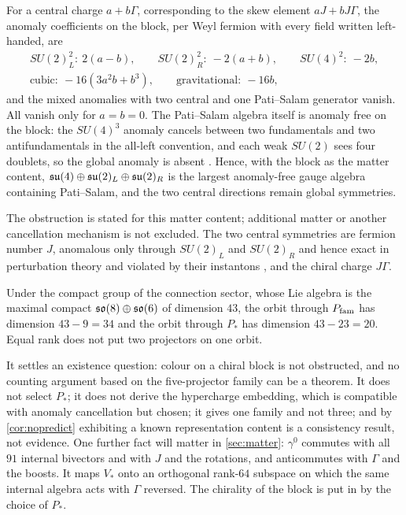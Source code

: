 \begin{proposition}
\label{prop:PSanom}
For a central charge $a+b\Gamma$, corresponding to the skew element $aJ+bJ\Gamma$, the anomaly coefficients on the block, per Weyl
fermion with every field written left-handed, are
\[
\begin{gathered}
SU(2)_L^2:\ 2(a-b),\qquad SU(2)_R^2:\ -2(a+b),\qquad SU(4)^2:\ -2b,\\
\text{cubic}:\ -16(3a^2b+b^3),\qquad \text{gravitational}:\ -16b ,
\end{gathered}
\]
and the mixed anomalies with two central and one Pati--Salam generator vanish. All vanish only for $a=b=0$. The Pati--Salam algebra itself
is anomaly free on the block: the $SU(4)^3$ anomaly cancels between two fundamentals and two antifundamentals in the all-left convention,
and each weak $SU(2)$ sees four doublets, so the global anomaly is absent \cite{Witten82}. Hence, with the block as the matter content,
$\mathfrak{su}(4)\oplus\mathfrak{su}(2)_L\oplus\mathfrak{su}(2)_R$ is the largest anomaly-free gauge algebra containing Pati--Salam, and the two central directions remain
global symmetries.
\end{proposition}

The obstruction is stated for this matter content; additional matter or another cancellation mechanism is not excluded. The two central
symmetries are fermion number $J$, anomalous only through $SU(2)_L$ and $SU(2)_R$ and hence exact in perturbation theory and violated by
their instantons \cite{tHooft76}, and the chiral charge $J\Gamma$.

\begin{proposition}
\label{prop:orbits}
Under the compact group of the connection sector, whose Lie algebra is the maximal compact $\mathfrak{so}(8)\oplus\mathfrak{so}(6)$ of dimension $43$, the orbit
through $P_{\rm fam}$ has dimension $43-9=34$ and the orbit through $P_*$ has dimension $43-23=20$. Equal rank does not put two projectors on
one orbit.
\end{proposition}

\begin{remark}
\label{rem:PSsettles}
It settles an existence question: colour on a chiral block is not obstructed, and no counting argument based on the five-projector family
can be a theorem. It does not select $P_*$; it does not derive the hypercharge embedding, which is compatible with anomaly cancellation but
chosen; it gives one family and not three; and by \cref{cor:nopredict} exhibiting a known representation content is a consistency result,
not evidence. One further fact will matter in \cref{sec:matter}: $\gamma^0$ commutes with all $91$ internal bivectors and with $J$ and the
rotations, and anticommutes with $\Gamma$ and the boosts. It maps $V_*$ onto an orthogonal rank-$64$ subspace on which the same internal
algebra acts with $\Gamma$ reversed. The chirality of the block is put in by the choice of $P_*$.
\end{remark}
